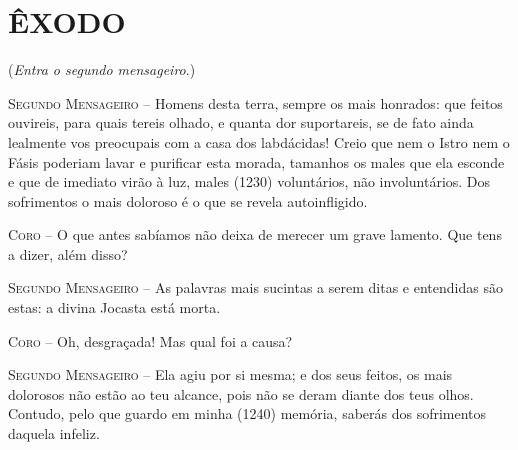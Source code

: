 \section{ÊXODO}

(\emph{Entra o segundo mensageiro}.)

\textsc{Segundo Mensageiro} --   Homens desta terra, sempre os mais honrados: que feitos ouvireis, para
quais tereis olhado, e quanta dor suportareis, se de fato ainda lealmente
vos preocupais com a casa dos labdácidas! Creio que nem o Istro nem o
Fásis poderiam lavar e purificar esta morada, tamanhos os males que ela
esconde e que de imediato virão à luz, males (1230) voluntários, não
involuntários. Dos sofrimentos o mais doloroso é o que se revela
autoinfligido.

\textsc{Coro} --   O que antes sabíamos não deixa de merecer um grave lamento. Que tens a
dizer, além disso?

\textsc{Segundo Mensageiro} --   As palavras mais sucintas a serem ditas e entendidas são estas: a divina
Jocasta está morta.

\textsc{Coro} --   Oh, desgraçada! Mas qual foi a causa?

\textsc{Segundo Mensageiro} --   Ela agiu por si mesma; e dos seus feitos, os mais dolorosos não estão ao
teu alcance, pois não se deram diante dos teus olhos. Contudo, pelo que
guardo em minha (1240) memória, saberás dos sofrimentos daquela infeliz.

